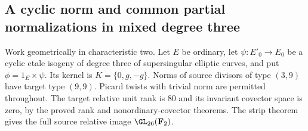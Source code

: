 \subsection{A cyclic norm and common partial normalizations in mixed degree three}
\label{subsec:mixed-degree-three-norm-candidate}

Work geometrically in characteristic two. Let $E$ be ordinary,
let $\psi:E'_0\to E_0$ be a cyclic etale isogeny of degree three
of supersingular elliptic curves, and put $\phi=1_E\times\psi$.
Its kernel is $K=\{0,g,-g\}$. Norms of source divisors of type
$(3,9)$ have target type $(9,9)$. Picard twists with trivial
norm are permitted throughout. The target relative unit rank
is $80$ and its invariant covector space is zero, by the proved
rank and nonordinary-covector theorems. The strip theorem gives
the full source relative image $\GL_{26}(\mathbf F_2)$.

